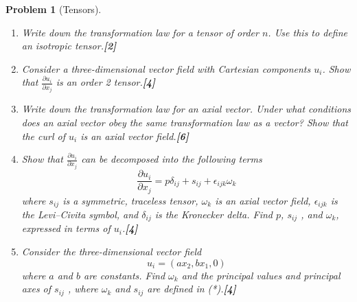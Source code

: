 \documentclass[a4paper]{article}
\theoremstyle{new}
\newtheorem{qns}{Problem}[section]
\begin{document}
\newpage
\begin{qns}[Tensors]\leavevmode
\begin{enumerate}[label=(\roman*)]
\item Write down the transformation law for a tensor of order $n$. Use this to define an isotropic tensor.\hfill\textbf{[2]}
\item Consider a three-dimensional vector field with Cartesian components $u_i$. Show that $\frac{\partial u_i}{\partial x_j}$ is an order 2 tensor.\hfill\textbf{[4]}
\item  Write down the transformation law for an axial vector. Under what conditions does an axial vector obey the same transformation law as a vector? Show that the curl of $u_i$ is an axial vector field.\hfill\textbf{[6]}
\item Show that $\frac{\partial u_i}{\partial x_j}$ can be decomposed into the following terms
\begin{equation}
    \frac{\partial u_i}{\partial x_j}=p\delta_{ij}+s_{ij}+\epsilon_{ijk}\omega_k\tag{*}
\end{equation}
where $s_{ij}$ is a symmetric, traceless tensor, $\omega_k$ is an axial vector field, $\epsilon_{ijk}$ is the Levi–Civita symbol, and $\delta_{ij}$ is the Kronecker delta. Find $p$, $s_{ij}$ , and $\omega_k$, expressed in terms of $u_i$.\hfill\textbf{[4]}
\item Consider the three-dimensional vector field
$$u_i=(ax_2,bx_1,0)$$
where $a$ and $b$ are constants. Find $\omega_k$ and the principal values and principal axes of $s_{ij}$ , where $\omega_k$ and $s_{ij}$ are defined in (*).\hfill\textbf{[4]}
\end{enumerate}
\end{qns}
\end{document}
